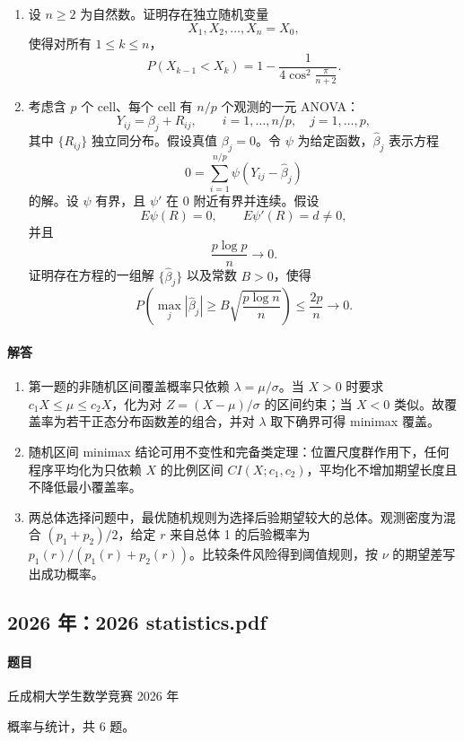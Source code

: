 \documentclass[UTF8,12pt]{ctexart}
\begin{document}
\begin{enumerate}[label=\textbf{\arabic*.},leftmargin=2.2em]
\item 设 \(n\ge2\) 为自然数。证明存在独立随机变量
\[
X_1,X_2,\ldots,X_n=X_0,
\]
使得对所有 \(1\le k\le n\)，
\[
P(X_{k-1}<X_k)=1-\frac{1}{4\cos^2\frac{\pi}{n+2}}.
\]

\item 考虑含 \(p\) 个 cell、每个 cell 有 \(n/p\) 个观测的一元 ANOVA：
\[
Y_{ij}=\beta_j+R_{ij},\qquad i=1,\ldots,n/p,\quad j=1,\ldots,p,
\]
其中 \(\{R_{ij}\}\) 独立同分布。假设真值 \(\beta_j=0\)。令 \(\psi\) 为给定函数，\(\hat\beta_j\) 表示方程
\[
0=\sum_{i=1}^{n/p}\psi(Y_{ij}-\hat\beta_j)
\]
的解。设 \(\psi\) 有界，且 \(\psi'\) 在 \(0\) 附近有界并连续。假设
\[
E\psi(R)=0,\qquad E\psi'(R)=d\ne0,
\]
并且
\[
\frac{p\log p}{n}\to0.
\]
证明存在方程的一组解 \(\{\hat\beta_j\}\) 以及常数 \(B>0\)，使得
\[
P\left(\max_j|\hat\beta_j|\ge
B\sqrt{\frac{p\log n}{n}}\right)
\le \frac{2p}{n}\to0.
\]
\end{enumerate}

\paragraph{解答}
\begin{enumerate}[label=\textbf{\arabic*.},leftmargin=2.2em]
\item 第一题的非随机区间覆盖概率只依赖 \(\lambda=\mu/\sigma\)。当 \(X>0\) 时要求 \(c_1X\le\mu\le c_2X\)，化为对 \(Z=(X-\mu)/\sigma\) 的区间约束；当 \(X<0\) 类似。故覆盖率为若干正态分布函数差的组合，并对 \(\lambda\) 取下确界可得 minimax 覆盖。
\item 随机区间 minimax 结论可用不变性和完备类定理：位置尺度群作用下，任何程序平均化为只依赖 \(X\) 的比例区间 \(CI(X;c_1,c_2)\)，平均化不增加期望长度且不降低最小覆盖率。
\item 两总体选择问题中，最优随机规则为选择后验期望较大的总体。观测密度为混合 \((p_1+p_2)/2\)，给定 \(r\) 来自总体 1 的后验概率为 \(p_1(r)/(p_1(r)+p_2(r))\)。比较条件风险得到阈值规则，按 \(\nu\) 的期望差写出成功概率。
\end{enumerate}

\subsection{2026 年：2026 statistics.pdf}
\paragraph{题目}
丘成桐大学生数学竞赛 2026 年

概率与统计，共 6 题。
\end{document}
